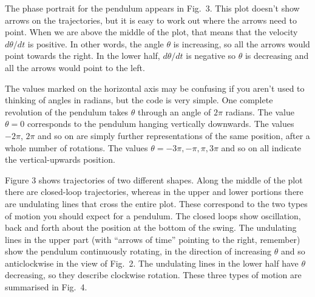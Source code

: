   The phase portrait for the pendulum appears in Fig.\ 3. This plot doesn't 
  show arrows on the trajectories, but it is easy to work out where the arrows 
  need to point. When we are above the middle of the plot, that means that the 
  velocity $d\theta / dt$ is positive. In other words, the angle $\theta$ is 
  increasing, so all the arrows would point towards the right. In the lower 
  half, $d\theta / dt$ is negative so $\theta$ is decreasing and all the arrows 
  would point to the left. 


  The values marked on the horizontal axis may be confusing if you aren't used 
  to thinking of angles in radians, but the code is very simple. One complete 
  revolution of the pendulum takes $\theta$ through an angle of $2\pi$ radians. 
  The value $\theta=0$ corresponds to the pendulum hanging vertically 
  downwards. The values $-2\pi$, $2\pi$ and so on are simply further 
  representations of the same position, after a whole number of rotations. The 
  values $\theta = -3\pi,-\pi,\pi,3\pi$ and so on all indicate the 
  vertical-upwards position. 

  Figure 3 shows trajectories of two different shapes. Along the middle of the 
  plot there are closed-loop trajectories, whereas in the upper and lower 
  portions there are undulating lines that cross the entire plot. These 
  correspond to the two types of motion you should expect for a pendulum. The 
  closed loops show oscillation, back and forth about the position at the 
  bottom of the swing. The undulating lines in the upper part (with ``arrows of 
  time'' pointing to the right, remember) show the pendulum continuously 
  rotating, in the direction of increasing $\theta$ and so anticlockwise in the 
  view of Fig.\ 2. The undulating lines in the lower half have $\theta$ 
  decreasing, so they describe clockwise rotation. These three types of motion 
  are summarised in Fig.\ 4. 


